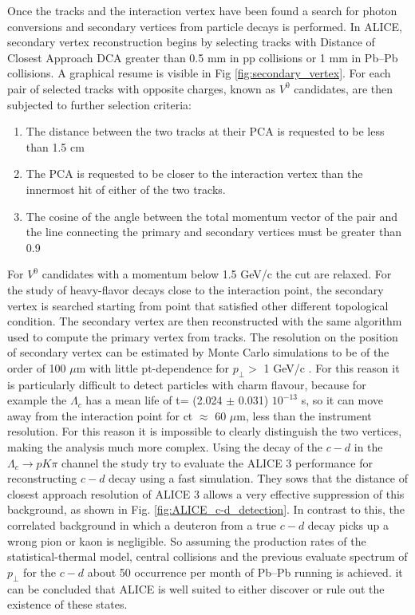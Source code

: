 \documentclass[12pt,a4paper]{book}
\begin{document}
Once the tracks and the interaction vertex have been found a search for photon conversions and secondary vertices from particle decays is performed. In ALICE, secondary vertex reconstruction begins by selecting tracks with Distance of Closest Approach DCA greater than 0.5 mm in pp collisions or 1 mm in Pb–Pb collisions. A graphical resume is visible in Fig \ref{fig:secondary_vertex}. For each pair of selected tracks with opposite charges, known as $V^0$ candidates, are then subjected to further selection criteria: 
\begin{enumerate}
	\item The distance between the two tracks at their PCA is requested to be less than 1.5 cm
	\item The PCA is requested to be closer to the interaction vertex than the innermost hit of either of the two tracks.
	\item The cosine of the angle between the total momentum vector of the pair and the line connecting the primary and secondary vertices must be greater than 0.9
\end{enumerate} 
For $V^0$ candidates with a momentum below 1.5 GeV/c the cut are relaxed. For the study of heavy-flavor decays close to the interaction point, the secondary vertex is searched starting from point that satisfied other different topological condition. \cite{ALICE:2014sbxFs} The secondary vertex are then reconstructed with the same algorithm used to compute the primary vertex from tracks. The resolution on the position of secondary vertex can be estimated by Monte Carlo simulations to be of the order of 100 $\mu$m with little pt-dependence for $p_\perp >$ 1 GeV/c \cite{2012}. For this reason it is particularly difficult to detect particles with charm flavour, because for example the $\Lambda_c$ has a mean life of t= (2.024 $\pm$ 0.031) $10^{-13}$ s, so it can move away from the interaction point for ct $\approx$ 60 $\mu$m, less than the instrument resolution. For this reason it is impossible to clearly distinguish the two vertices, making the analysis much more complex. Using the decay of the $c-d$ in the $\Lambda_c \to p K \pi$ channel the study \cite{alicecollaboration2022letterintentalice3} try to evaluate  the ALICE 3 performance for reconstructing $c-d$ decay using a fast simulation. They sows that the distance of closest approach resolution of ALICE 3 allows a very effective suppression of this background, as shown in Fig. \ref{fig:ALICE_c-d_detection}. In contrast to this, the correlated background in which a deuteron from a true $c-d$ decay picks up a wrong pion or kaon is negligible. So assuming the production rates of the statistical-thermal model, central collisions and the previous evaluate spectrum of $p_\perp$ for the $c-d$ about 50 occurrence per month of Pb–Pb running is achieved. it can be concluded that ALICE is well suited to either discover or rule out the existence of these states.
\end{document}
